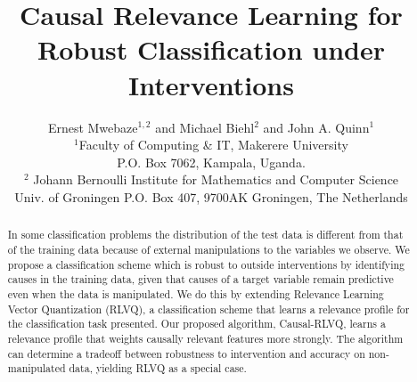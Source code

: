 \documentclass{esannV2}
\begin{document}
\title{Causal Relevance Learning for Robust Classification under Interventions}

\author{Ernest Mwebaze$^{1,2}$ and Michael Biehl$^2$ and John A. Quinn$^1$ 
%
%
\vspace{.3cm}\\
%
$^1$Faculty of Computing \& IT, Makerere University \\
P.O. Box 7062, Kampala, Uganda.%
\vspace{.1cm}\\
$^2$ Johann Bernoulli Institute for Mathematics and Computer Science \\
Univ. of Groningen P.O. Box 407, 9700AK Groningen, The Netherlands\\
}

\maketitle

\begin{abstract}
In some classification problems the distribution of the test data is different from that of the training data because of external manipulations to the variables we observe. We propose a classification scheme which is robust to outside interventions by identifying causes in the training data, given that causes of a target variable remain predictive even when the data is manipulated. We do this by extending Relevance Learning Vector Quantization (RLVQ), a classification scheme that learns a relevance profile for the classification task presented. Our proposed algorithm, Causal-RLVQ, learns a relevance profile that weights causally relevant features more strongly. The algorithm can determine a tradeoff between robustness to intervention and accuracy on non-manipulated data, yielding RLVQ as a special case.

\end{abstract}
\end{document}
